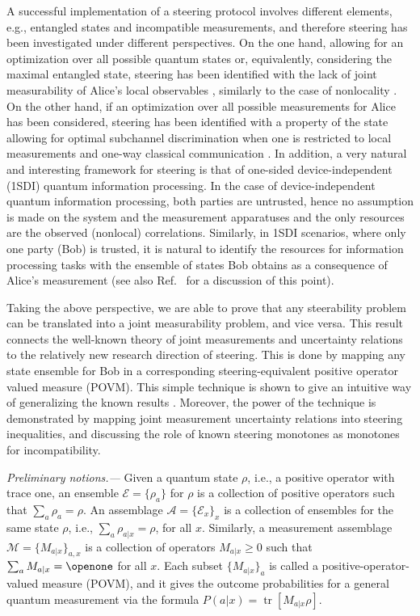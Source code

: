 \documentclass[10pt,twocolumn,aps,prl,nobibnotes,showpacs,superscriptaddress,floatfix]{revtex4-1}
\DeclareMathOperator{\tr}{tr}
\theoremstyle{definition}
\begin{document}
A successful implementation of a steering protocol involves different elements, e.g., entangled states and incompatible measurements, and therefore steering has been investigated under different perspectives. On the one hand, allowing for an optimization over all possible quantum states or, equivalently, considering the maximal entangled state, steering has been identified with the lack of joint measurability of Alice's local observables \cite{Uola14, Quint14}, similarly to the case of nonlocality \cite{Wolf09}. On the other hand, if an optimization over all possible measurements for Alice has been considered, steering has been identified with a property of the state allowing for optimal subchannel discrimination when one is restricted to local measurements and one-way classical communication \cite{Piani15}.
%
In addition, a very natural and interesting framework for steering is that of one-sided device-independent (1SDI) quantum information processing. In the case of device-independent quantum information processing, both parties are untrusted, hence no assumption is made on the system and the measurement apparatuses and the only resources are the observed (nonlocal) correlations. Similarly, in 1SDI scenarios, where only one party (Bob) is trusted, it is natural to identify the resources for information processing tasks with the ensemble of states Bob obtains as a consequence of Alice's measurement (see also Ref.~\cite{Gallego14} for a discussion of this point).

Taking the above perspective, we are able to prove that any steerability problem can be translated into a joint measurability problem,  and vice versa. 
This result connects the well-known theory of joint measurements \cite{Busch85,Busch86} and uncertainty relations \cite{BLW14,UPrev,BLW13,BLWRev} to the relatively new research direction of steering. This is done by mapping any state ensemble for Bob in a corresponding steering-equivalent positive operator valued measure (POVM).  This simple technique is shown to give an intuitive way of generalizing the known results \cite{Uola14,Quint14}. Moreover, the power of the technique is demonstrated by mapping joint measurement uncertainty relations \cite{BLW14} into steering inequalities, and discussing the role of known steering monotones as monotones for incompatibility. 

{\it Preliminary notions.---} 
Given a quantum state $\rho$, i.e., a positive operator with trace one, an ensemble $\mathcal{E}=\{\rho_a\}$ 
for $\rho$ is a collection of positive operators such that $\sum_a \rho_a=\rho$. An assemblage $\mathcal{A}=\{\mathcal{E}_x\}_x$ is a collection of ensembles for the same state $\rho$, i.e., $\sum_a \rho_{a|x} =\rho$, for all $x$.
Similarly, a measurement assemblage $\mathcal{M}=\{M_{a|x}\}_{a,x}$ is a collection of operators $M_{a|x}\geq 0$ such that $\sum_a M_{a|x}=\openone$ for all $x$. Each subset  $\{M_{a|x}\}_a$  is called a positive-operator-valued measure (POVM), and it gives the outcome probabilities for a general quantum measurement via the formula $P(a|x)=\tr[M_{a|x} \rho]$.
\end{document}
